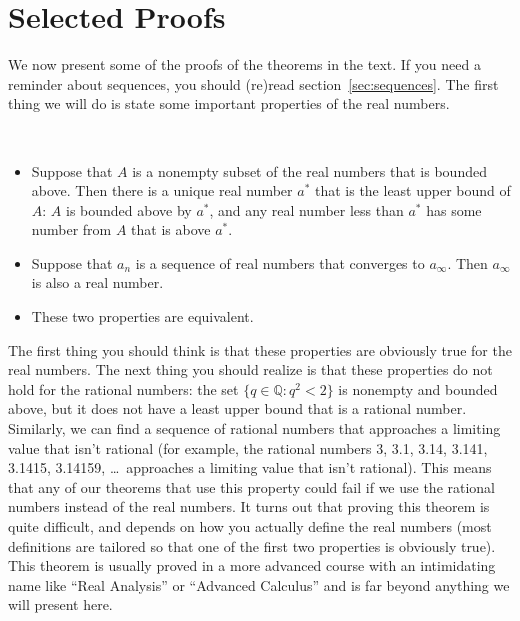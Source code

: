 \clearpage\thispagestyle{empty}\cleardoublepage

\chapter{Selected Proofs}\thispagestyle{empty}

We now present some of the proofs of the theorems in the text.  If you need a reminder about sequences, you should (re)read section~\ref{sec:sequences}.  The first thing we will do is state some important properties of the real numbers.

{\hspace{0pt}\\[-5ex]\begin{itemize}
\item Suppose that $A$ is a nonempty subset of the real numbers that is bounded above.  Then there is a unique real number $a^*$ that is the least upper bound of $A$: $A$ is bounded above by $a^*$, and any real number less than $a^*$ has some number from $A$ that is above $a^*$.
\item Suppose that $a_n$ is a sequence of real numbers that converges to $a_\infty$.  Then $a_\infty$ is also a real number.
\item These two properties are equivalent.
\end{itemize}}

The first thing you should think is that these properties are obviously true for the real numbers.  The next thing you should realize is that these properties do not hold for the rational numbers: the set $\{q\in\mathbb{Q}:q^2<2\}$ is nonempty and bounded above, but it does not have a least upper bound that is a rational number.  Similarly, we can find a sequence of rational numbers that approaches a limiting value that isn't rational (for example, the rational numbers 3, 3.1, 3.14, 3.141, 3.1415, 3.14159, \ldots\ approaches a limiting value that isn't rational).  This means that any of our theorems that use this property could fail if we use the rational numbers instead of the real numbers.  It turns out that proving this theorem is quite difficult, and depends on how you actually define the real numbers (most definitions are tailored so that one of the first two properties is obviously true).  This theorem is usually proved in a more advanced course with an intimidating name like ``Real Analysis'' or ``Advanced Calculus'' and is far beyond anything we will present here.

